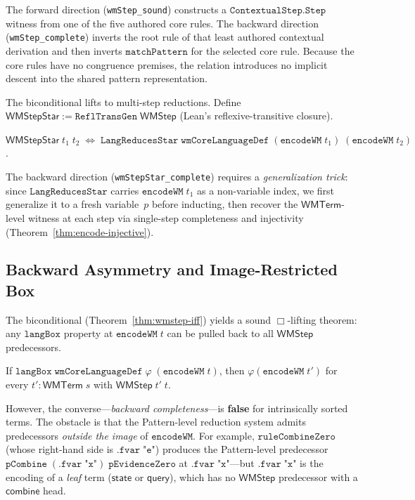 \documentclass[11pt,openany]{report}
\begin{document}
\noindent
The forward direction (\texttt{wmStep\_sound}) constructs a
$\mathtt{ContextualStep.Step}$ witness from one of the five authored core
rules.  The backward direction (\texttt{wmStep\_complete}) inverts the root
rule of that least authored contextual derivation and then inverts
$\mathtt{matchPattern}$ for the selected core rule.  Because the core rules
have no congruence premises, the relation introduces no implicit descent into
the shared pattern representation.

The biconditional lifts to multi-step reductions.
Define $\mathsf{WMStepStar} := \mathtt{ReflTransGen}\;\mathsf{WMStep}$
(Lean's reflexive-transitive closure).

\begin{theorem}
\label{thm:star-adequate}
$\mathsf{WMStepStar}\;t_1\;t_2 \;\Leftrightarrow\;
\mathtt{LangReducesStar}\;\mathtt{wmCoreLanguageDef}\;
(\mathtt{encodeWM}\;t_1)\;(\mathtt{encodeWM}\;t_2)$.
\end{theorem}

\noindent
The backward direction (\texttt{wmStepStar\_complete}) requires a
\emph{generalization trick}: since $\mathtt{LangReducesStar}$ carries
$\mathtt{encodeWM}\;t_1$ as a non-variable index, we first generalize
it to a fresh variable~$p$ before inducting, then recover the
$\mathsf{WMTerm}$-level witness at each step via single-step
completeness and injectivity (Theorem~\ref{thm:encode-injective}).

\subsection{Backward Asymmetry and Image-Restricted Box}
\label{sec:wm-backward-asymmetry}
\label{sec:wm-image-box}

The biconditional (Theorem~\ref{thm:wmstep-iff}) yields a sound
$\Box$-lifting theorem: any $\mathtt{langBox}$ property at
$\mathtt{encodeWM}\;t$ can be pulled back to all $\mathsf{WMStep}$
predecessors.

\begin{theorem}
If $\mathtt{langBox}\;\mathtt{wmCoreLanguageDef}\;\varphi\;(\mathtt{encodeWM}\;t)$,
then $\varphi(\mathtt{encodeWM}\;t')$ for every
$t' : \mathsf{WMTerm}\;s$ with $\mathsf{WMStep}\;t'\;t$.
\end{theorem}

\noindent
However, the converse---\emph{backward completeness}---is \textbf{false}
for intrinsically sorted terms.
The obstacle is that the Pattern-level reduction system admits
predecessors \emph{outside the image} of $\mathtt{encodeWM}$.
For example, $\mathtt{ruleCombineZero}$ (whose right-hand side is
$\mathtt{.fvar}\;\texttt{"e"}$) produces the Pattern-level predecessor
$\mathtt{pCombine}\;(\mathtt{.fvar}\;\texttt{"x"})\;\mathtt{pEvidenceZero}$
at $\mathtt{.fvar}\;\texttt{"x"}$---but $\mathtt{.fvar}\;\texttt{"x"}$
is the encoding of a \emph{leaf} term ($\mathsf{state}$ or
$\mathsf{query}$), which has no $\mathsf{WMStep}$ predecessor with a
$\mathsf{combine}$ head.
\end{document}
